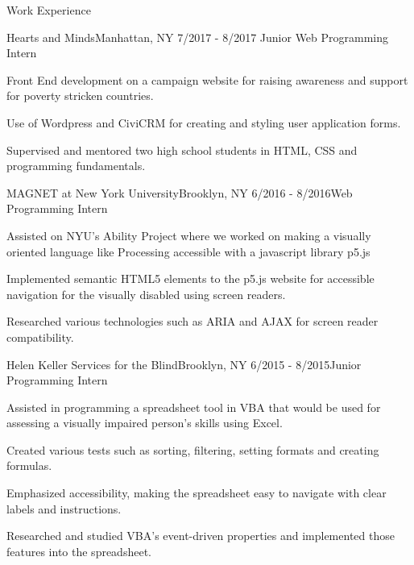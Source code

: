 \documentclass[10pt]{resume} %
\begin{document}

\begin{rSection}{Work Experience}

\begin{rSubsection}{Hearts and Minds}{Manhattan, NY 7/2017 -  8/2017 }{Junior Web Programming Intern}{}
\item Front End development on a campaign website for raising awareness and support for poverty stricken countries.
\item Use of Wordpress and CiviCRM for creating and styling user application forms.
\item Supervised and mentored two high school students in HTML, CSS and programming fundamentals.
\end{rSubsection}

\begin{rSubsection}{MAGNET at New York University}{Brooklyn, NY 6/2016 - 8/2016}{Web Programming Intern}{}
\item Assisted on NYU's Ability Project where we worked on making a visually oriented language like Processing accessible with a javascript library p5.js
\item Implemented semantic HTML5 elements to the p5.js website for accessible navigation for the visually disabled using screen readers.
\item Researched various technologies such as ARIA and AJAX for screen reader compatibility. 		
\end{rSubsection}

\begin{rSubsection}{Helen Keller Services for the Blind}{Brooklyn, NY 6/2015 - 8/2015}{Junior Programming Intern}{}
\item Assisted in programming a spreadsheet tool in VBA that would be used for assessing a visually impaired person's skills using Excel.
\item Created various tests such as sorting, filtering, setting formats and creating formulas.
\item Emphasized accessibility, making the spreadsheet easy to navigate with clear labels and instructions.
\item Researched and studied VBA's event-driven properties and implemented those features into the spreadsheet.
\end{rSubsection}
\end{rSection}%
\end{document}
